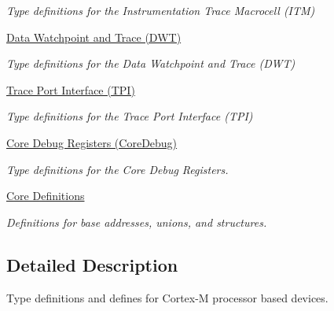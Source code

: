 \begin{DoxyCompactItemize}
\begin{DoxyCompactList}\small\item\em Type definitions for the Instrumentation Trace Macrocell (I\-T\-M) \end{DoxyCompactList}\item 
\hyperlink{group__CMSIS__DWT}{Data Watchpoint and Trace (\-D\-W\-T)}
\begin{DoxyCompactList}\small\item\em Type definitions for the Data Watchpoint and Trace (D\-W\-T) \end{DoxyCompactList}\item 
\hyperlink{group__CMSIS__TPI}{Trace Port Interface (\-T\-P\-I)}
\begin{DoxyCompactList}\small\item\em Type definitions for the Trace Port Interface (T\-P\-I) \end{DoxyCompactList}\item 
\hyperlink{group__CMSIS__CoreDebug}{Core Debug Registers (\-Core\-Debug)}
\begin{DoxyCompactList}\small\item\em Type definitions for the Core Debug Registers. \end{DoxyCompactList}\item 
\hyperlink{group__CMSIS__core__base}{Core Definitions}
\begin{DoxyCompactList}\small\item\em Definitions for base addresses, unions, and structures. \end{DoxyCompactList}\end{DoxyCompactItemize}


\subsection{Detailed Description}
Type definitions and defines for Cortex-\/\-M processor based devices. 